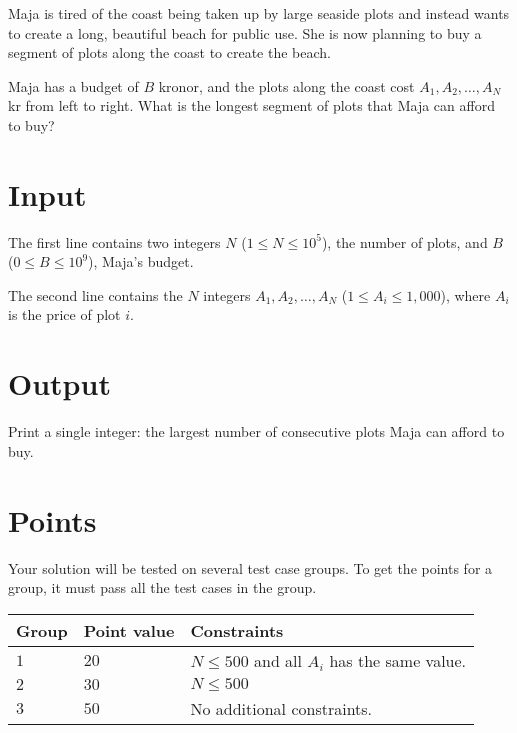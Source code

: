 \noindent
Maja is tired of the coast being taken up by large seaside plots and instead wants to create a long, beautiful beach for public use.
She is now planning to buy a segment of plots along the coast to create the beach.

Maja has a budget of $B$ kronor, and the plots along the coast cost $A_1, A_2, \dots, A_N$ kr from left to right.
What is the longest segment of plots that Maja can afford to buy?

\section*{Input}
The first line contains two integers $N$ ($1 \leq N \leq 10^5$), the number of plots, and $B$ ($0 \leq B \leq 10^9$), Maja's budget.

The second line contains the $N$ integers $A_1, A_2, \dots, A_N$ ($1 \le A_i \le 1,000$), where $A_i$ is the price of plot $i$.

\section*{Output}
Print a single integer: the largest number of consecutive plots Maja can afford to buy.

\section*{Points}
Your solution will be tested on several test case groups.
To get the points for a group, it must pass all the test cases in the group.

\noindent
\begin{tabular}{| l | l | l |}
  \hline
  \textbf{Group} & \textbf{Point value} & \textbf{Constraints} \\ \hline
  $1$   & $20$       & $N \leq 500 $ and all $A_i$ has the same value.\\ \hline
  $2$   & $30$       & $N \leq 500 $\\ \hline
  $3$   & $50$       & No additional constraints. \\ \hline
\end{tabular}

